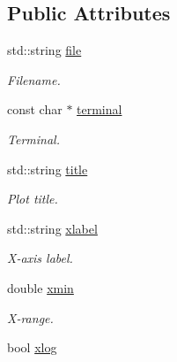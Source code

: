 \subsection*{Public Attributes}
\begin{DoxyCompactItemize}
\item 
\hypertarget{a00426_a4b4e4bd081b2f2b015397f8950a22be8}{std\-::string \hyperlink{a00426_a4b4e4bd081b2f2b015397f8950a22be8}{file}}\label{a00426_a4b4e4bd081b2f2b015397f8950a22be8}

\begin{DoxyCompactList}\small\item\em Filename. \end{DoxyCompactList}\item 
\hypertarget{a00426_abfcca98c98780c4db2691cd60ef7452d}{const char $\ast$ \hyperlink{a00426_abfcca98c98780c4db2691cd60ef7452d}{terminal}}\label{a00426_abfcca98c98780c4db2691cd60ef7452d}

\begin{DoxyCompactList}\small\item\em Terminal. \end{DoxyCompactList}\item 
\hypertarget{a00426_a2c37a761410c3f661c1450aad66a4439}{std\-::string \hyperlink{a00426_a2c37a761410c3f661c1450aad66a4439}{title}}\label{a00426_a2c37a761410c3f661c1450aad66a4439}

\begin{DoxyCompactList}\small\item\em Plot title. \end{DoxyCompactList}\item 
\hypertarget{a00426_aedab4e547a2e928c342ff40bf22a4937}{std\-::string \hyperlink{a00426_aedab4e547a2e928c342ff40bf22a4937}{xlabel}}\label{a00426_aedab4e547a2e928c342ff40bf22a4937}

\begin{DoxyCompactList}\small\item\em X-\/axis label. \end{DoxyCompactList}\item 
\hypertarget{a00426_ac43ef2605d95cd10f504dc1861d078cd}{double \hyperlink{a00426_ac43ef2605d95cd10f504dc1861d078cd}{xmin}}\label{a00426_ac43ef2605d95cd10f504dc1861d078cd}

\begin{DoxyCompactList}\small\item\em X-\/range. \end{DoxyCompactList}\item 
\hypertarget{a00426_afaaddcfa4a3d0331875c2585ab7f2fca}{bool \hyperlink{a00426_afaaddcfa4a3d0331875c2585ab7f2fca}{xlog}}\label{a00426_afaaddcfa4a3d0331875c2585ab7f2fca}


\end{DoxyCompactItemize}
